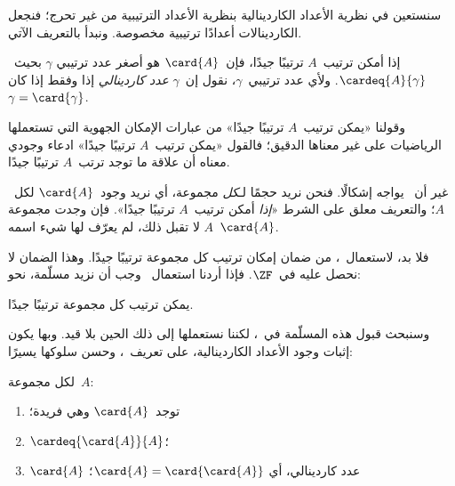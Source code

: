 \documentclass[../../../include/open-logic-section]{subfiles}
\begin{document}

سنستعين في نظرية الأعداد الكاردينالية بنظرية الأعداد الترتيبية من غير
تحرج؛ فنجعل الكاردينالات أعدادًا ترتيبية مخصوصة. ونبدأ بالتعريف الآتي.

\begin{defn}
إذا أمكن ترتيب~$A$ ترتيبًا جيدًا، فإن~$\card{A}$ هو أصغر عدد ترتيبي
$\gamma$ بحيث~$\cardeq{A}{\gamma}$. ولأي عدد ترتيبي~$\gamma$، نقول
إن~$\gamma$ \emph{عدد كاردينالي} إذا وفقط إذا كان
$\gamma = \card{\gamma}$.
\end{defn}

وقولنا «يمكن ترتيب~$A$ ترتيبًا جيدًا» من عبارات الإمكان الجهوية التي
تستعملها الرياضيات على غير معناها الدقيق؛ فالقول «يمكن ترتيب~$A$
ترتيبًا جيدًا» ادعاء وجودي معناه أن علاقة ما توجد ترتب~$A$ ترتيبًا
جيدًا.

غير أن~ يواجه إشكالًا. فنحن نريد حجمًا
لـ\emph{كل} مجموعة، أي نريد وجود~$\card{A}$ لكل~$A$؛ والتعريف معلق
على الشرط «\emph{إذا} أمكن ترتيب~$A$ ترتيبًا جيدًا». فإن وجدت مجموعة
$A$ لا تقبل ذلك، لم يعرّف لها شيء اسمه~$\card{A}$.

فلا بد، لاستعمال~، من ضمان إمكان ترتيب كل
مجموعة ترتيبًا جيدًا. وهذا الضمان لا نحصل عليه في~$\ZF$. فإذا أردنا
استعمال~ وجب أن نزيد مسلّمة، نحو:
\begin{axiom}
يمكن ترتيب كل مجموعة ترتيبًا جيدًا.
\end{axiom}
وسنبحث قبول هذه المسلّمة في~، لكننا نستعملها
إلى ذلك الحين بلا قيد. وبها يكون إثبات وجود الأعداد الكاردينالية، على
تعريف~، وحسن سلوكها يسيرًا:

\begin{lem}
لكل مجموعة~$A$:
\begin{enumerate}
	\item{} توجد~$\card{A}$ وهي فريدة؛
	\item{} $\cardeq{\card{A}}{A}$؛
	\item{} $\card{A}$ عدد كاردينالي، أي
	$\card{A} = \card{\card{A}}$؛
\end{enumerate}
\end{lem}
\end{document}
